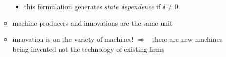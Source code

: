 \documentclass[12pt]{article}
\newcommand{\ar}{$\Rightarrow$ \ }
\begin{document}
\begin{itemize}
\begin{itemize}
\begin{itemize}
\item this formulation generates \textit{state dependence} if $\delta \neq 0$.                                                                                                                                                                                                                                                                                                                                                                                                                                                                                                                                                                                                                                                                                                                                                                                                                                                                                                                                                                                                                                                                                                                                                                                                                                                                                                                                                                                                                                                                                                                                                                                                                                                                                                                                                                                                                                                                                                                                                                                                                                                                                                                                                                                                                                                                                                                                                                                                                                                                                                                                                                                                                                                         
\end{itemize} 
\item machine producers and innovations are the same unit
\item innovation is on the variety of machines! \ar there are new machines being invented not the technology of existing firms
\end{itemize}
\end{itemize} 
\end{document}
